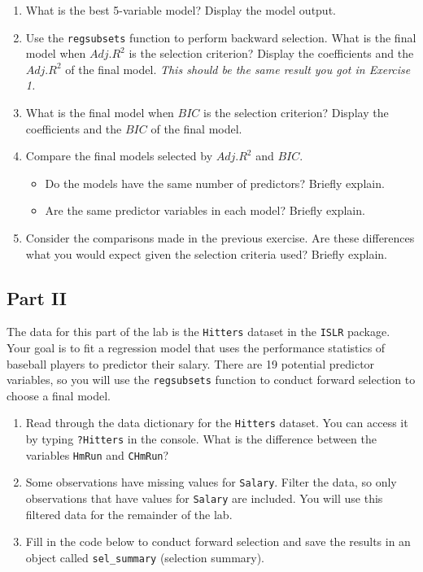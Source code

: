 \documentclass[]{book}
\providecommand{\tightlist}{%
  \setlength{\itemsep}{0pt}\setlength{\parskip}{0pt}}
\begin{document}
\begin{enumerate}
\def\labelenumi{\arabic{enumi}.}
\setcounter{enumi}{1}
\item
  What is the best 5-variable model? Display the model output.
\item
  Use the \texttt{regsubsets} function to perform backward selection.
  What is the final model when \(Adj. R^2\) is the selection criterion?
  Display the coefficients and the \(Adj. R^2\) of the final model.
  \emph{This should be the same result you got in Exercise 1.}
\item
  What is the final model when \(BIC\) is the selection criterion?
  Display the coefficients and the \(BIC\) of the final model.
\item
  Compare the final models selected by \(Adj. R^2\) and \(BIC\).

  \begin{itemize}
  \tightlist
  \item
    Do the models have the same number of predictors? Briefly explain.
  \item
    Are the same predictor variables in each model? Briefly explain.
  \end{itemize}
\item
  Consider the comparisons made in the previous exercise. Are these
  differences what you would expect given the selection criteria used?
  Briefly explain.
\end{enumerate}

\subsection{Part II}\label{part-ii-1}

The data for this part of the lab is the \texttt{Hitters} dataset in the
\texttt{ISLR} package. Your goal is to fit a regression model that uses
the performance statistics of baseball players to predictor their
salary. There are 19 potential predictor variables, so you will use the
\texttt{regsubsets} function to conduct forward selection to choose a
final model.

\begin{enumerate}
\def\labelenumi{\arabic{enumi}.}
\setcounter{enumi}{6}
\item
  Read through the data dictionary for the \texttt{Hitters} dataset. You
  can access it by typing \texttt{?Hitters} in the console. What is the
  difference between the variables \texttt{HmRun} and \texttt{CHmRun}?
\item
  Some observations have missing values for \texttt{Salary}. Filter the
  data, so only observations that have values for \texttt{Salary} are
  included. You will use this filtered data for the remainder of the
  lab.
\item
  Fill in the code below to conduct forward selection and save the
  results in an object called \texttt{sel\_summary} (selection summary).
\end{enumerate}
\end{document}
